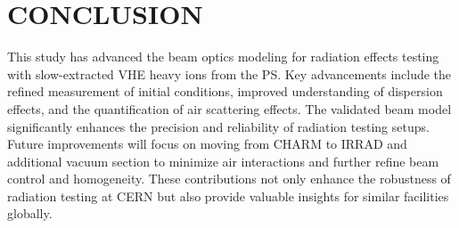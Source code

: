 \documentclass[a4paper,
               biblatex,     %
               ]{jacow}
\begin{document}













\section{CONCLUSION}

This study has advanced the beam optics modeling for radiation effects testing with slow-extracted VHE heavy ions from the PS. Key advancements include the refined measurement of initial conditions, improved understanding of dispersion effects, and the quantification of air scattering effects. The validated beam model significantly enhances the precision and reliability of radiation testing setups. Future improvements will focus on moving from CHARM to IRRAD and additional vacuum section to minimize air interactions and further refine beam control and homogeneity. These contributions not only enhance the robustness of radiation testing at CERN but also provide valuable insights for similar facilities globally.
\end{document}
